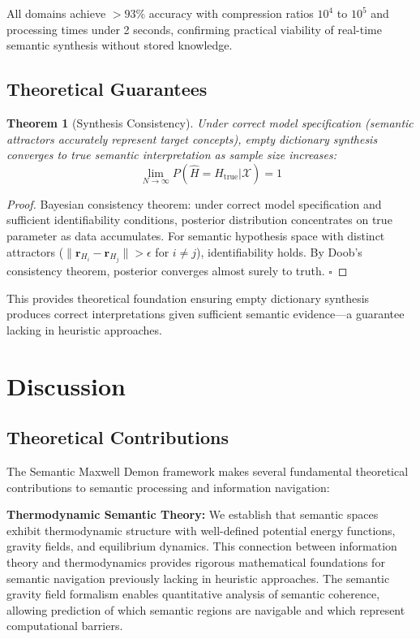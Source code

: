 \documentclass[12pt,a4paper]{article}
\newtheorem{theorem}{Theorem}
\begin{document}
All domains achieve $>93\%$ accuracy with compression ratios $10^4$ to $10^5$ and processing times under 2 seconds, confirming practical viability of real-time semantic synthesis without stored knowledge.

\subsection{Theoretical Guarantees}

\begin{theorem}[Synthesis Consistency]
Under correct model specification (semantic attractors accurately represent target concepts), empty dictionary synthesis converges to true semantic interpretation as sample size increases:
\begin{equation}
\lim_{N \to \infty} P(\hat{H} = H_{\text{true}} | \mathcal{X}) = 1
\end{equation}
\end{theorem}

\begin{proof}
Bayesian consistency theorem: under correct model specification and sufficient identifiability conditions, posterior distribution concentrates on true parameter as data accumulates. For semantic hypothesis space with distinct attractors ($\|\mathbf{r}_{H_i} - \mathbf{r}_{H_j}\| > \epsilon$ for $i \neq j$), identifiability holds. By Doob's consistency theorem, posterior converges almost surely to truth. $\square$
\end{proof}

This provides theoretical foundation ensuring empty dictionary synthesis produces correct interpretations given sufficient semantic evidence—a guarantee lacking in heuristic approaches.


\section{Discussion}

\subsection{Theoretical Contributions}

The Semantic Maxwell Demon framework makes several fundamental theoretical contributions to semantic processing and information navigation:

\textbf{Thermodynamic Semantic Theory:} We establish that semantic spaces exhibit thermodynamic structure with well-defined potential energy functions, gravity fields, and equilibrium dynamics. This connection between information theory and thermodynamics provides rigorous mathematical foundations for semantic navigation previously lacking in heuristic approaches. The semantic gravity field formalism enables quantitative analysis of semantic coherence, allowing prediction of which semantic regions are navigable and which represent computational barriers.
\end{document}
